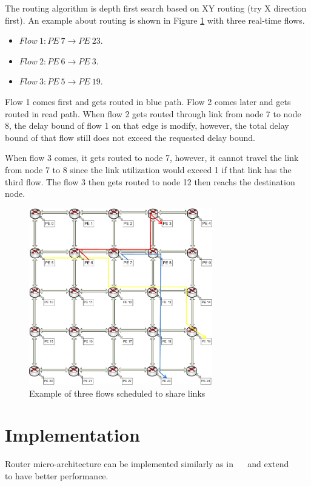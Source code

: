 \documentclass[conference, twocolumn]{IEEEtran}
\theoremstyle{definition}
\begin{document}
The routing algorithm is depth first search based on XY routing (try X
direction first). An example about routing is shown in Figure
\ref{fig:3FlowsEx} with three real-time flows.
\begin{itemize}
  \item $Flow \ 1: PE \ 7 \rightarrow PE \ 23$.
  \item $Flow \ 2: PE \ 6 \rightarrow PE \ 3$.
  \item $Flow \ 3: PE \ 5 \rightarrow PE \ 19$.
\end{itemize} 

Flow 1 comes first and gets routed in blue path. Flow 2 comes later and gets
routed in read path.  When flow 2 gets routed through link from node 7 to node
8, the delay bound of flow 1 on that edge is modify, however, the total delay
bound of that flow still does not exceed the requested delay bound.

When flow 3 comes, it gets routed to node 7, however, it cannot travel the
link from node 7 to 8 since the link utilization would exceed 1 if that link
has the third flow. The flow 3 then gets routed to node 12 then reachs the
destination node.

\begin{figure}[htp]
\centering
\includegraphics[width=8cm]{pics/Example.png}
\caption[Three flows example.]
{Example of three flows scheduled to share links}\label{fig:3FlowsEx}
\end{figure}

\section{Implementation}
Router micro-architecture can be implemented similarly as in
~\cite{Rexford98arouter}~\cite{ZhangService} and extend
~\cite{PehDelayModel}~\cite{PehSpecPipeR} to have better performance.
\end{document}
